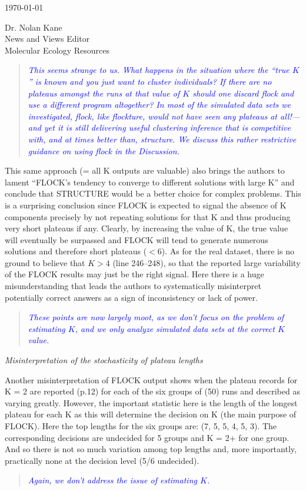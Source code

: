 \documentclass[11pt]{letter}
\newcommand{\reply}[1]{\begin{quotation}\small\sl\textcolor{blue}{#1}\end{quotation}}
\begin{document}
\begin{letter}{ \today 

Dr. Nolan Kane\\
News and Views Editor\\
Molecular Ecology Resources \\
}
\reply{This seems strange to us.  What happens in the situation where the
``true $K$'' is known and you just want to cluster individuals? If there are no plateaus
amongst the runs at that value of $K$ should one discard {\sc flock} and use
a different program altogether? In most of the simulated data sets we investigated, {\sc flock},
like {\sc flockture},
would not have seen any plateaus at all!---and yet it is still delivering useful clustering
inference that is competitive with, and at times better than, {\sc structure}.  We discuss
this rather restrictive guidance on using {\sc flock} in the Discussion.  }

This same approach (= all K outputs are valuable) also brings the authors to lament ``FLOCK's tendency to converge to different solutions with large K'' and conclude that STRUCTURE would be a better choice for complex problems. This is a surprising conclusion since FLOCK is expected to signal the absence of K components precisely by not repeating solutions for that K and thus producing very short plateaus if any. Clearly, by increasing the value of K, the true value will eventually be surpassed and FLOCK will tend to generate numerous solutions and therefore short plateaus ($< 6$). As for the real dataset, there is no ground to believe that $K > 4$ (line 246--248), so that the reported large variability of the FLOCK results may just be the right signal. Here there is a huge misunderstanding that leads the authors to systematically misinterpret potentially correct answers as a sign of inconsistency or lack of power.

\reply{These points are now largely moot, as we don't focus on the problem of estimating $K$, and we
only analyze simulated data sets at the correct $K$ value.}

{\em Misinterpretation of the stochasticity of plateau lengths}

Another misinterpretation of FLOCK output shows when the plateau records for K = 2 are reported (p.12) for each of the six groups of (50) runs and described as varying greatly. However, the important statistic here is the length of the longest plateau for each K as this will determine the decision on K (the main purpose of FLOCK). Here the top lengths for the six groups are: (7, 5, 5, 4, 5, 3). The corresponding decisions are undecided for 5 groups and K = 2+ for one group. And so there is not so much variation among top lengths and, more importantly, practically none at the decision level (5/6 undecided).

\reply{Again, we don't address the issue of estimating $K$. }



\end{letter}
\end{document}
